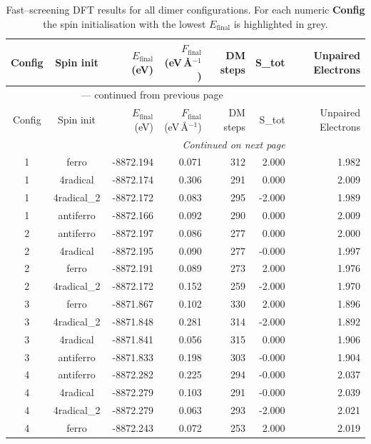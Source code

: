 
\begin{longtable}{@{}ccrrrrr@{}}
\caption{Fast–screening DFT results for all dimer configurations.
         For each numeric \textbf{Config} the spin initialisation with the
         lowest $E_{\mathrm{final}}$ is highlighted in grey.}\label{tab:dimer_full}\\
\toprule
Config & Spin init & $E_{\mathrm{final}}$ (eV) &
$F_{\mathrm{final}}$ (eV\,\AA$^{-1}$) & DM steps & S_{tot} & Unpaired Electrons\\
\midrule
\endfirsthead
\multicolumn{6}{c}{{\tablename}~\thetable{} — continued from previous page}\\
\toprule
Config & Spin init & $E_{\mathrm{final}}$ (eV) &
$F_{\mathrm{final}}$ (eV\,\AA$^{-1}$) & DM steps & S_{tot} & Unpaired Electrons\\
\midrule
\endhead
\midrule
\multicolumn{6}{r}{\emph{Continued on next page}}\\
\endfoot
\bottomrule
\endlastfoot
\rowcolor{gray!20} 1 & ferro & -8872.194 & 0.071 & 312 & 2.000 & 1.982 \\
1 & 4radical & -8872.174 & 0.306 & 291 & 0.000 & 2.009 \\
1 & 4radical\_2 & -8872.172 & 0.083 & 295 & -2.000 & 1.989 \\
1 & antiferro & -8872.166 & 0.092 & 290 & 0.000 & 2.009 \\
\rowcolor{gray!20} 2 & antiferro & -8872.197 & 0.086 & 277 & 0.000 & 2.000 \\
2 & 4radical & -8872.195 & 0.090 & 277 & -0.000 & 1.997 \\
2 & ferro & -8872.191 & 0.089 & 273 & 2.000 & 1.976 \\
2 & 4radical\_2 & -8872.172 & 0.152 & 259 & -2.000 & 1.970 \\
\rowcolor{gray!20} 3 & ferro & -8871.867 & 0.102 & 330 & 2.000 & 1.896 \\
3 & 4radical\_2 & -8871.848 & 0.281 & 314 & -2.000 & 1.892 \\
3 & 4radical & -8871.841 & 0.056 & 315 & 0.000 & 1.906 \\
3 & antiferro & -8871.833 & 0.198 & 303 & -0.000 & 1.904 \\
\rowcolor{gray!20} 4 & antiferro & -8872.282 & 0.225 & 294 & -0.000 & 2.037 \\
4 & 4radical & -8872.279 & 0.103 & 291 & -0.000 & 2.039 \\
4 & 4radical\_2 & -8872.279 & 0.063 & 293 & -2.000 & 2.021 \\
4 & ferro & -8872.243 & 0.072 & 253 & 2.000 & 2.019 \\

\end{longtable}
